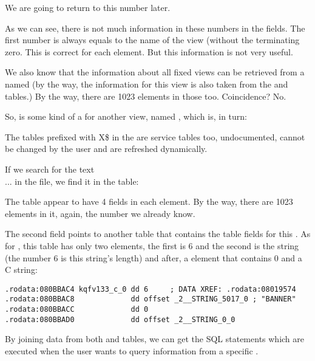 We are going to return to this number later.

As we can see, there is not much information in these numbers in the fields. The first number is always equals to the name of the view (without the terminating zero.
This is correct for each element. But this information is not very useful.

We also know that the information about all fixed views can be retrieved from a  named 
(by the way, the information for this view is also taken from the  and  tables.)
By the way, there are 1023 elements in those too. Coincidence? No.



So,  is some kind of a  for another view, named , which is, in turn:



The tables prefixed with X\$ in the \oracle are service tables too, undocumented, cannot be changed by the user and are refreshed dynamically.

If we search for the text \\

...  in the  file, we find it in the  table:



The table appear to have 4 fields in each element. By the way, there are 1023 elements in it, again, the number we already know.

The second field points to another table that contains the table fields for this .
As for , this table has only two elements, the first is 6 and the second is 
the  string (the number 6 is this string's length) and after, a  element that contains 
0 and a  C string:

\begin{lstlisting}[caption=kqf.o,style=customasmx86]
.rodata:080BBAC4 kqfv133_c_0 dd 6     ; DATA XREF: .rodata:08019574
.rodata:080BBAC8             dd offset _2__STRING_5017_0 ; "BANNER"
.rodata:080BBACC             dd 0
.rodata:080BBAD0             dd offset _2__STRING_0_0
\end{lstlisting}

By joining data from both  and  tables, we can get the SQL statements which are executed when the user wants to query information from a specific .

